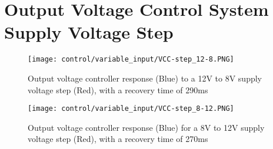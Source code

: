 \section{Output Voltage Control System Supply Voltage Step} \label{A:control_supply_step}

\begin{figure}[H]
    \begin{center}
        \texttt{[image: control/variable\_input/VCC-step\_12-8.PNG]}
        \caption{Output voltage controller response (Blue) to a 12V to 8V supply voltage step (Red), with a recovery time of 290ms}
    \end{center}
\end{figure}

\begin{figure}[H]
    \begin{center}
        \texttt{[image: control/variable\_input/VCC-step\_8-12.PNG]}
        \caption{Output voltage controller response (Blue) for a 8V to 12V supply voltage step (Red), with a recovery time of 270ms}
    \end{center}
\end{figure}